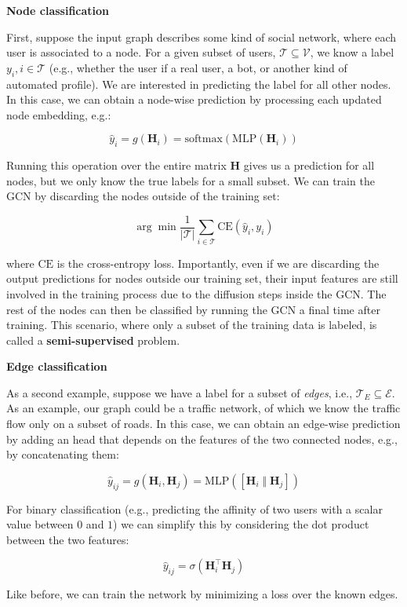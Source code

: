 \textbf{Node classification}

First, suppose the input graph describes some kind of social network, where each user is associated to a node. For a given subset of users, $\mathcal{T} \subseteq \mathcal{V}$, we know a label $y_i, i \in \mathcal{T}$ (e.g., whether the user if a real user, a bot, or another kind of automated profile). We are interested in predicting the label for all other nodes. In this case, we can obtain a node-wise prediction by processing each updated node embedding, e.g.:

$$
\hat{y}_i=g(\mathbf{H}_i) =\text{softmax}(\text{MLP}(\mathbf{H}_i))
$$

Running this operation over the entire matrix $\mathbf{H}$ gives us a prediction for all nodes, but we only know the true labels for a small subset. We can train the GCN by discarding the nodes outside of the training set:

$$
\arg\min \frac{1}{\lvert \mathcal{T} \rvert}\sum_{i \in \mathcal{T}} \text{CE}(\hat{y}_i,y_i)
$$

where $\text{CE}$ is the cross-entropy loss. Importantly, even if we are discarding the output predictions for nodes outside our training set, their input features are still involved in the training process due to the diffusion steps inside the GCN. The rest of the nodes can then be classified by running the GCN a final time after training. This scenario, where only a subset of the training data is labeled, is called a \textbf{semi-supervised} problem.

\textbf{Edge classification}

As a second example, suppose we have a label for a subset of \textit{edges}, i.e., $\mathcal{T}_E \subseteq \mathcal{E}$. As an example, our graph could be a traffic network, of which we know the traffic flow only on a subset of roads. In this case, we can obtain an edge-wise prediction by adding an head that depends on the features of the two connected nodes, e.g., by concatenating them:

$$
\hat{y}_{ij} = g(\mathbf{H}_i, \mathbf{H}_j)= \text{MLP}\left(\left[ \mathbf{H}_i \;\Vert \; \mathbf{H}_j\right]\right)
$$

For binary classification (e.g., predicting the affinity of two users with a scalar value between $0$ and $1$) we can simplify this by considering the dot product between the two features:

$$
\hat{y}_{ij} = \sigma( \mathbf{H}_i^\top \mathbf{H}_j)
$$

Like before, we can train the network by minimizing a loss over the known edges.

